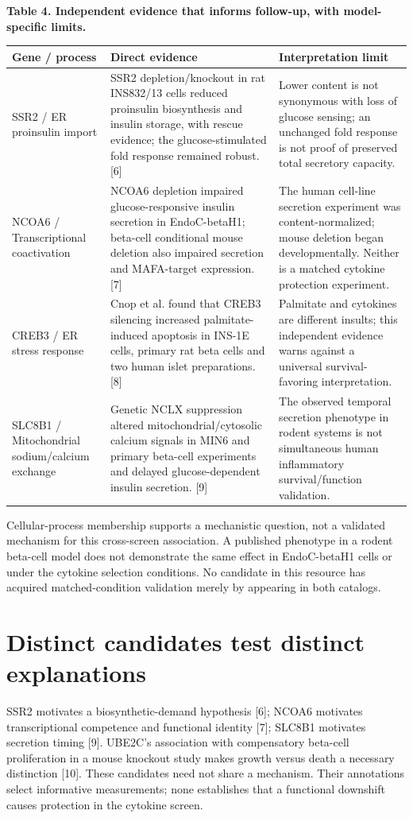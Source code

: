 \documentclass[10pt,letterpaper]{article}
\begin{document}
{\small\textbf{Table 4. Independent evidence that informs follow-up, with model-specific limits.}\par}
{\small\begin{longtable}{>{\raggedright\arraybackslash}p{1.14in}>{\raggedright\arraybackslash}p{2.78in}>{\raggedright\arraybackslash}p{2.00in}}\toprule
\textbf{Gene / process} & \textbf{Direct evidence} & \textbf{Interpretation limit}\\\midrule\endhead
SSR2 / ER proinsulin import & SSR2 depletion/knockout in rat INS832/13 cells reduced proinsulin biosynthesis and insulin storage, with rescue evidence; the glucose-stimulated fold response remained robust. [6] & Lower content is not synonymous with loss of glucose sensing; an unchanged fold response is not proof of preserved total secretory capacity.\\
NCOA6 / Transcriptional coactivation & NCOA6 depletion impaired glucose-responsive insulin secretion in EndoC-betaH1; beta-cell conditional mouse deletion also impaired secretion and MAFA-target expression. [7] & The human cell-line secretion experiment was content-normalized; mouse deletion began developmentally. Neither is a matched cytokine protection experiment.\\
CREB3 / ER stress response & Cnop et al. found that CREB3 silencing increased palmitate-induced apoptosis in INS-1E cells, primary rat beta cells and two human islet preparations. [8] & Palmitate and cytokines are different insults; this independent evidence warns against a universal survival-favoring interpretation.\\
SLC8B1 / Mitochondrial sodium/calcium exchange & Genetic NCLX suppression altered mitochondrial/cytosolic calcium signals in MIN6 and primary beta-cell experiments and delayed glucose-dependent insulin secretion. [9] & The observed temporal secretion phenotype in rodent systems is not simultaneous human inflammatory survival/function validation.\\
\bottomrule\end{longtable}}
Cellular-process membership supports a mechanistic question, not a validated mechanism for this cross-screen association. A published phenotype in a rodent beta-cell model does not demonstrate the same effect in EndoC-betaH1 cells or under the cytokine selection conditions. No candidate in this resource has acquired matched-condition validation merely by appearing in both catalogs.

\section*{Distinct candidates test distinct explanations}
SSR2 motivates a biosynthetic-demand hypothesis [6]; NCOA6 motivates transcriptional competence and functional identity [7]; SLC8B1 motivates secretion timing [9]. UBE2C's association with compensatory beta-cell proliferation in a mouse knockout study makes growth versus death a necessary distinction [10]. These candidates need not share a mechanism. Their annotations select informative measurements; none establishes that a functional downshift causes protection in the cytokine screen.
\end{document}
